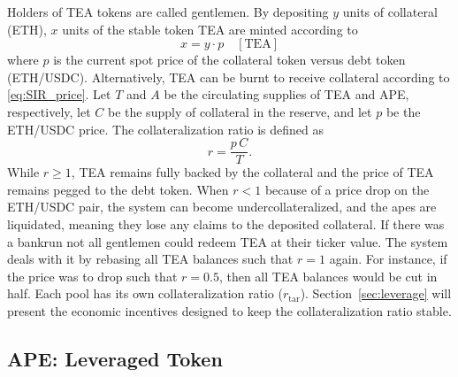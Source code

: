 \documentclass[journal,letterpaper,oneside,onecolumn,12pt]{IEEEtran}
\begin{document}
	Holders of TEA tokens are called gentlemen.
	By depositing $y$ units of collateral (ETH), $x$ units of the stable token TEA are minted according to
	\begin{equation} \label{eq:SIR_price} 
		x = y \cdot p \quad[\text{TEA}] 
	\end{equation}
	where $p$ is the current spot price of the collateral token versus debt token (ETH/USDC).	
	Alternatively, TEA can be burnt to receive collateral according to \eqref{eq:SIR_price}.
	Let $T$ and $A$ be the circulating supplies of TEA and APE, respectively, let $C$ be the supply of collateral in the reserve, and let $p$ be the ETH/USDC price. The collateralization ratio is defined as
	\begin{equation} \label{eq:collateralization_factor}
		r = \frac{p\,C}{T}.
	\end{equation}
	While $r\geq1$, TEA remains fully backed by the collateral and the price of TEA remains pegged to the debt token. When $r<1$ because of a price drop on the ETH/USDC pair, the system can become undercollateralized, and the apes are liquidated, meaning they lose any claims to the deposited collateral. If there was a bankrun not all gentlemen could redeem TEA at their ticker value. The system deals with it by rebasing all TEA balances such that $r=1$ again. For instance, if the price was to drop such that $r=0.5$, then all TEA balances would be cut in half. Each pool has its own collateralization ratio ($r_\textrm{tar}$). Section~\ref{sec:leverage} will present the economic incentives designed to keep the collateralization ratio stable.
	

	
	\subsection{APE: Leveraged Token} \label{sec:APE}
	
\end{document}
